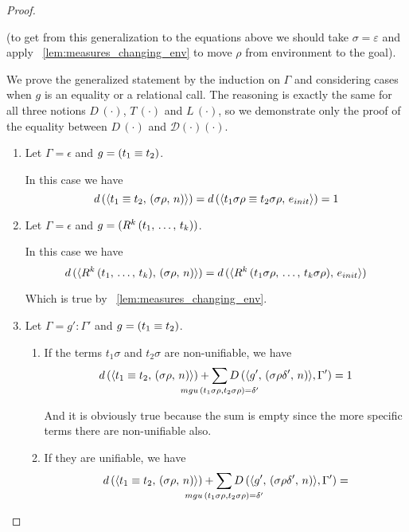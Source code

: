 \begin{proof}
\begin{enumerate}
(to get from this generalization to the equations above we should take $\sigma = \varepsilon$ and apply \lemmaword~\ref{lem:measures_changing_env} to move $\rho$ from environment to the goal).

We prove the generalized statement by the induction on $\Gamma$ and considering cases when $g$ is an equality or a relational call. The reasoning is exactly the same for all three notions $D\,(\cdot)$, $T\,(\cdot)$ and $L\,(\cdot)$, so we demonstrate only the proof of the equality between $D\,(\cdot)$ and $\mathcal{D}(\cdot)(\cdot)$.

	\begin{enumerate}

	\item Let $\Gamma = \epsilon$ and $g = (t_1 \equiv t_2)$.
	
	In this case we have \[ d\,(\langle t_1 \equiv t_2 ,\, (\sigma \rho ,\, n) \rangle) = d\,(\langle t_1 \sigma \rho \equiv t_2 \sigma \rho ,\, e_{init} \rangle) = 1 \]
	
	\item Let $\Gamma = \epsilon$ and $g = (R^k\,(t_1, \, \dots, \, t_k))$.
	
	In this case we have \[ d\,(\langle R^k\,(t_1, \, \dots, \, t_k) ,\, (\sigma \rho ,\, n) \rangle) = d\,(\langle R^k\,(t_1 \sigma \rho, \, \dots, \, t_k \sigma \rho) ,\, e_{init} \rangle) \]
	
	Which is true by \lemmaword~\ref{lem:measures_changing_env}.
	
	\item Let $\Gamma = g' : \Gamma'$ and $g = (t_1 \equiv t_2)$.
	
	\begin{enumerate}
	
	    \item If the terms $t_1 \sigma$ and $t_2 \sigma$ are non-unifiable, we have \[ d\,(\taskst{\unigoal{t_1}{t_2}}{\mkenv{\sigma \rho}{n}}) + \smashoperator{\sum\limits_{mgu\,(t_1 \sigma \rho, t_2 \sigma \rho) = \delta'}} D\,(\taskst{g'}{\mkenv{\sigma \rho \delta'}{n}}, \Gamma') = 1 \]
	    
	    And it is obviously true because the sum is empty since the more specific terms there are non-unifiable also.
	
	    \item If they are unifiable, we have \[ d\,(\taskst{\unigoal{t_1}{t_2}}{\mkenv{\sigma \rho}{n}}) + \smashoperator{\sum\limits_{mgu\,(t_1 \sigma \rho, t_2 \sigma \rho) = \delta'}} D\,(\taskst{g'}{\mkenv{\sigma \rho \delta'}{n}}, \Gamma') = \]
	

\end{enumerate}
\end{enumerate}
\end{enumerate}
\end{proof}
